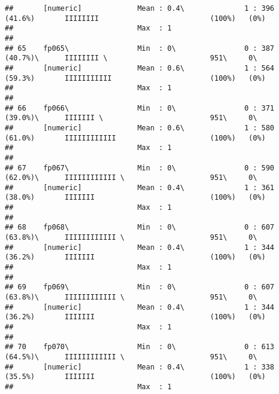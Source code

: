 \documentclass[]{article}
\begin{document}
\begin{verbatim}
##       [numeric]             Mean : 0.4\              1 : 396 (41.6%)       IIIIIIII                          (100%)   (0%)     
##                             Max  : 1                                                                                           
## 
## 65    fp065\                Min  : 0\                0 : 387 (40.7%)\      IIIIIIII \                        951\     0\       
##       [numeric]             Mean : 0.6\              1 : 564 (59.3%)       IIIIIIIIIII                       (100%)   (0%)     
##                             Max  : 1                                                                                           
## 
## 66    fp066\                Min  : 0\                0 : 371 (39.0%)\      IIIIIII \                         951\     0\       
##       [numeric]             Mean : 0.6\              1 : 580 (61.0%)       IIIIIIIIIIII                      (100%)   (0%)     
##                             Max  : 1                                                                                           
## 
## 67    fp067\                Min  : 0\                0 : 590 (62.0%)\      IIIIIIIIIIII \                    951\     0\       
##       [numeric]             Mean : 0.4\              1 : 361 (38.0%)       IIIIIII                           (100%)   (0%)     
##                             Max  : 1                                                                                           
## 
## 68    fp068\                Min  : 0\                0 : 607 (63.8%)\      IIIIIIIIIIII \                    951\     0\       
##       [numeric]             Mean : 0.4\              1 : 344 (36.2%)       IIIIIII                           (100%)   (0%)     
##                             Max  : 1                                                                                           
## 
## 69    fp069\                Min  : 0\                0 : 607 (63.8%)\      IIIIIIIIIIII \                    951\     0\       
##       [numeric]             Mean : 0.4\              1 : 344 (36.2%)       IIIIIII                           (100%)   (0%)     
##                             Max  : 1                                                                                           
## 
## 70    fp070\                Min  : 0\                0 : 613 (64.5%)\      IIIIIIIIIIII \                    951\     0\       
##       [numeric]             Mean : 0.4\              1 : 338 (35.5%)       IIIIIII                           (100%)   (0%)     
##                             Max  : 1                                                                                           

\end{verbatim}
\end{document}
